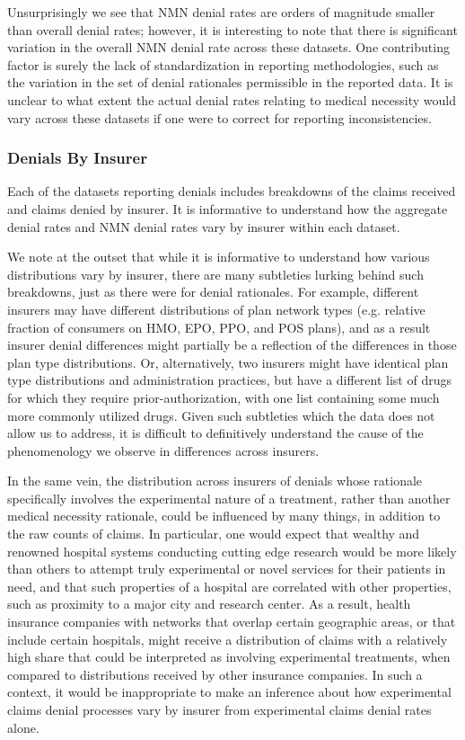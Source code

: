 \documentclass[12pt, a4paper,twoside]{report}
\theoremstyle{plain} %
\theoremstyle{definition} %
\theoremstyle{remark} %
\numberwithin{equation}{chapter}
\begin{document}
		
		Unsurprisingly we see that NMN denial rates are orders of magnitude smaller than overall denial rates; however, it is interesting to note that there is significant variation in the overall NMN denial rate across these datasets. One contributing factor is surely the lack of standardization in reporting methodologies, such as the variation in the set of denial rationales permissible in the reported data. It is unclear to what extent the actual denial rates relating to medical necessity would vary across these datasets if one were to correct for reporting inconsistencies. \\
		
		
		\subsubsection{Denials By Insurer}
		
		Each of the datasets reporting denials includes breakdowns of the claims received and claims denied by insurer. It is informative to understand how the aggregate denial rates and NMN denial rates vary by insurer within each dataset.
		
		We note at the outset that while it is informative to understand how various distributions vary by insurer, there are many subtleties lurking behind such breakdowns, just as there were for denial rationales. For example, different insurers may have different distributions of plan network types (e.g. relative fraction of consumers on HMO, EPO, PPO, and POS plans), and as a result insurer denial differences might partially be a reflection of the differences in those plan type distributions. Or, alternatively, two insurers might have identical plan type distributions and administration practices, but have a different list of drugs for which they require prior-authorization, with one list containing some much more commonly utilized drugs. Given such subtleties which the data does not allow us to address, it is difficult to definitively understand the cause of the phenomenology we observe in differences across insurers.
		
		In the same vein, the distribution across insurers of denials whose rationale specifically involves the experimental nature of a treatment, rather than another medical necessity rationale, could be influenced by many things, in addition to the raw counts of claims. In particular, one would expect that wealthy and renowned hospital systems conducting cutting edge research would be more likely than others to attempt truly experimental or novel services for their patients in need, and that such properties of a hospital are correlated with other properties, such as proximity to a major city and research center. As a result, health insurance companies with networks that overlap certain geographic areas, or that include certain hospitals, might receive a distribution of claims with a relatively high share that could be interpreted as involving experimental treatments, when compared to distributions received by other insurance companies. In such a context, it would be inappropriate to make an inference about how experimental claims denial processes vary by insurer from experimental claims denial rates alone.
		
\end{document}
